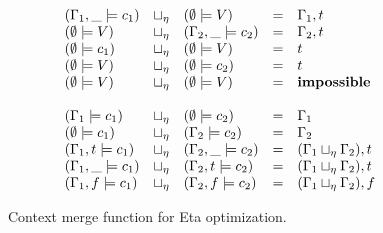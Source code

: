\documentclass[conference]{IEEEtran}
\begin{document}
\begin{figure}

    \begin{equation*}
        \begin{array}{l l l l l}
            (\Gamma_1,\_ \models c_1) & \sqcup_\eta & (\emptyset \models V)     & = & \Gamma_1,t                        \\
            (\emptyset \models V)     & \sqcup_\eta & (\Gamma_2,\_ \models c_2) & = & \Gamma_2,t                        \\
            (\emptyset \models c_1)   & \sqcup_\eta & (\emptyset \models V)     & = & t                                 \\
            (\emptyset \models V)     & \sqcup_\eta & (\emptyset \models c_2)   & = & t                                 \\
            (\emptyset \models V)     & \sqcup_\eta & (\emptyset \models V)     & = & \mathbf{impossible}               \\
            \\
            (\Gamma_1 \models c_1)    & \sqcup_\eta & (\emptyset \models c_2)   & = & \Gamma_1                          \\
            (\emptyset \models c_1)   & \sqcup_\eta & (\Gamma_2 \models c_2)    & = & \Gamma_2                          \\
            (\Gamma_1,t \models c_1)  & \sqcup_\eta & (\Gamma_2,\_ \models c_2) & = & (\Gamma_1 \sqcup_\eta \Gamma_2),t \\
            (\Gamma_1,\_ \models c_1) & \sqcup_\eta & (\Gamma_2,t \models c_2)  & = & (\Gamma_1 \sqcup_\eta \Gamma_2),t \\
            (\Gamma_1,f \models c_1)  & \sqcup_\eta & (\Gamma_2,f \models c_2)  & = & (\Gamma_1 \sqcup_\eta \Gamma_2),f \\
        \end{array}
    \end{equation*}
    \centering
    \caption{Context merge function for Eta optimization.}
    \label{fig:lazyeta-ctx}
\end{figure}
\end{document}
